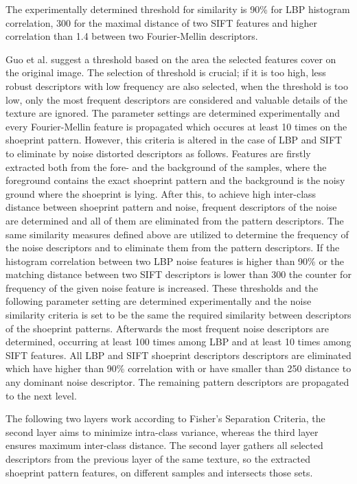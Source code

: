 \documentclass[draft,final]{vutinfth} %
\begin{document}
The experimentally determined threshold for similarity is  90\% for LBP histogram correlation, 300 for the maximal distance of two SIFT features and higher correlation than 1.4 between two Fourier-Mellin descriptors.
\par
Guo et al. \cite{guo2012discriminative} suggest a threshold based on the area the selected features cover on the original image.
The selection of threshold is crucial; if it is too high, less robust descriptors with low frequency are also selected, when the threshold is too low, only the most frequent descriptors are considered and valuable details of the texture are ignored.
The parameter settings are determined experimentally and every Fourier-Mellin feature is propagated which occures at least 10 times on the shoeprint pattern.
However, this criteria is altered in the case of LBP and SIFT to eliminate by noise distorted descriptors as follows.
Features are firstly extracted both from the fore- and the background of the samples, where the foreground contains the exact shoeprint pattern and the background is the noisy ground where the shoeprint is lying. 
After this, to achieve high inter-class distance between shoeprint pattern and noise, frequent descriptors of the noise are determined and all of them are eliminated from the pattern descriptors.
The same similarity measures defined above are utilized to determine the frequency of the noise descriptors and to eliminate them from the pattern descriptors.
If the histogram correlation between two LBP noise features is higher than 90\% or the matching distance between two SIFT descriptors is lower than 300 the counter for frequency of the given noise feature is increased.
These thresholds and the following parameter setting are determined experimentally and the noise similarity criteria is set to be the same the required similarity between descriptors of the shoeprint patterns.
Afterwards the most frequent noise descriptors are determined, occurring at least 100 times among LBP and at least 10 times among SIFT features.
All LBP and SIFT shoeprint descriptors descriptors are eliminated which have higher than 90\% correlation with or have smaller than 250 distance to any dominant noise descriptor.
The remaining pattern descriptors are propagated to the next level. 
\par
The following two layers work according to Fisher's Separation Criteria, the second layer aims to minimize intra-class variance, whereas the third layer ensures maximum inter-class distance. 
The second layer gathers all selected descriptors from the previous layer of the same texture, so the extracted shoeprint pattern features, on different samples and intersects those sets.
\end{document}
